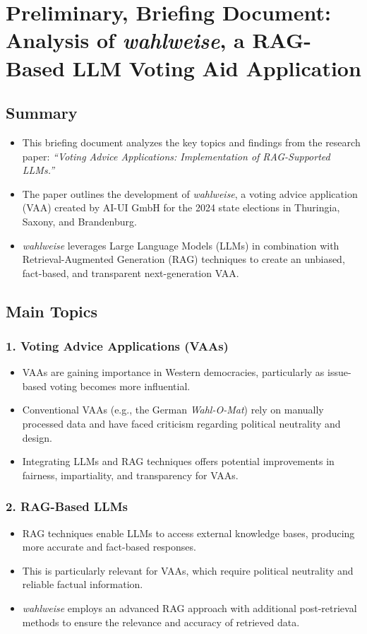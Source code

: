 \documentclass{article}
\begin{document}
\newpage
\section{Preliminary, Briefing Document: Analysis of \emph{wahlweise}, a RAG-Based LLM Voting Aid Application}

\subsection*{Summary}
\begin{itemize}
    \item This briefing document analyzes the key topics and findings from the research paper: 
    \emph{“Voting Advice Applications: Implementation of RAG-Supported LLMs.”}
    \item The paper outlines the development of \emph{wahlweise}, a voting advice application (VAA) created by AI-UI GmbH for the 2024 state elections in Thuringia, Saxony, and Brandenburg.
    \item \emph{wahlweise} leverages Large Language Models (LLMs) in combination with Retrieval-Augmented Generation (RAG) techniques to create an unbiased, fact-based, and transparent next-generation VAA.
\end{itemize}

\subsection*{Main Topics}

\subsubsection*{1. Voting Advice Applications (VAAs)}
\begin{itemize}
    \item VAAs are gaining importance in Western democracies, particularly as issue-based voting becomes more influential.
    \item Conventional VAAs (e.g., the German \emph{Wahl-O-Mat}) rely on manually processed data and have faced criticism regarding political neutrality and design.
    \item Integrating LLMs and RAG techniques offers potential improvements in fairness, impartiality, and transparency for VAAs.
\end{itemize}

\subsubsection*{2. RAG-Based LLMs}
\begin{itemize}
    \item RAG techniques enable LLMs to access external knowledge bases, producing more accurate and fact-based responses.
    \item This is particularly relevant for VAAs, which require political neutrality and reliable factual information.
    \item \emph{wahlweise} employs an advanced RAG approach with additional post-retrieval methods to ensure the relevance and accuracy of retrieved data.
\end{itemize}
\end{document}
